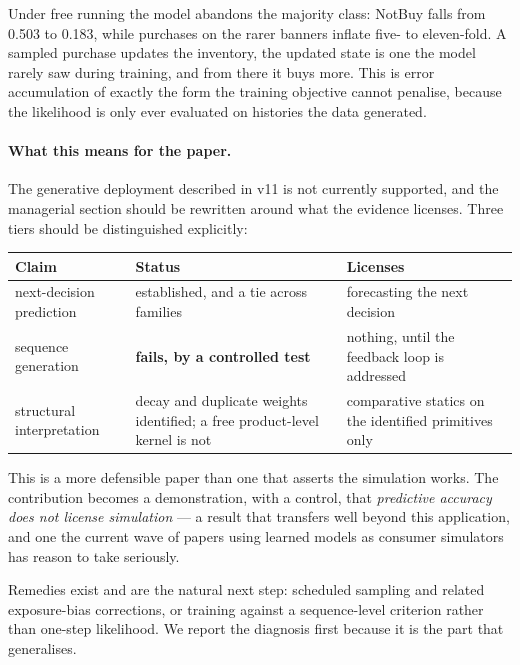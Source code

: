 \documentclass[11pt]{article}
\begin{document}
\noindent Under free running the model abandons the majority class: NotBuy falls
from 0.503 to 0.183, while purchases on the rarer banners inflate five- to
eleven-fold. A sampled purchase updates the inventory, the updated state is one
the model rarely saw during training, and from there it buys more. This is
error accumulation of exactly the form the training objective cannot penalise,
because the likelihood is only ever evaluated on histories the data generated.

\paragraph{What this means for the paper.} The generative deployment described
in v11 is not currently supported, and the managerial section should be
rewritten around what the evidence licenses. Three tiers should be distinguished
explicitly:

\begin{center}\small
\begin{tabular}{p{2.8cm}p{4.4cm}p{6.0cm}}
\toprule
Claim & Status & Licenses \\
\midrule
next-decision prediction & established, and a tie across families & forecasting
the next decision \\
sequence generation & \textbf{fails, by a controlled test} & nothing, until the
feedback loop is addressed \\
structural interpretation & decay and duplicate weights identified; a free
product-level kernel is not & comparative statics on the identified primitives
only \\
\bottomrule
\end{tabular}
\end{center}

\noindent This is a more defensible paper than one that asserts the simulation
works. The contribution becomes a demonstration, with a control, that
\emph{predictive accuracy does not license simulation} --- a result that
transfers well beyond this application, and one the current wave of papers using
learned models as consumer simulators has reason to take seriously.

Remedies exist and are the natural next step: scheduled sampling and related
exposure-bias corrections, or training against a sequence-level criterion rather
than one-step likelihood. We report the diagnosis first because it is the part
that generalises.
\end{document}
